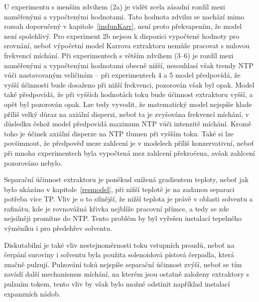 U experimentu s menším zdvihem (2a) je vidět zcela zásadní rozdíl mezi naměřenými a vypočtenými hodnotami.
Tato hodnota zdvihu se nachází mimo rozsah doporučený v kapitole~\ref{insfunKarr}, není proto překvapením, že model není spolehlivý.
Pro experiment 2b nejsou k dispozici vypočtené hodnoty pro srovnání, neboť výpočetní model Karrova extraktoru nemůže pracovat s nulovou frekvencí míchání.
Při experimentech s větším zdvihem (3--6) je rozdíl mezi naměřenými a vypočtenými hodnotami obecně nižší, nesouhlasí však trendy NTP vůči nastavovaným veličinám -- při experimentech 4 a 5 model předpovídá, že vyšší účinnosti bude dosaženo při nižší frekvenci, pozorován však byl opak.
Model také předpovídá, že při vyšších hodnotách toku bude účinnost extraktoru vyšší, a opět byl pozorován opak.
Lze tedy vyvodit, že matematický model nejspíše klade příliš velký důraz na axiální disperzi, neboť ta je zvyšována frekvencí míchání, v důsledku čehož model předpovídá maximum NTP vůči intenzitě míchání.
Kromě toho je účinek axiální disperze na NTP tlumen při vyšším toku.
Také si lze povšimnout, že předpověď meze zahlcení je v modelech příliš konzervativní, neboť při mnoha experimentech byla vypočtená mez zahlcení překročena, avšak zahlcení pozorováno nebylo.

Separační účinnost extraktoru je poněkud snížená gradientem teploty, neboť jak bylo ukázáno v kapitole~\ref{resmodel}, při nižší teplotě je na zadanou separaci potřeba více TP.
Vliv je o to silnější, že nižší teplota je právě v oblasti solventu a rafinátu, kde je rovnovážná křivka nejblíže pracovní přímce, a tedy se zde nejsilněji promítne do NTP.
Tento problém by byl vyřešen instalací tepelného výměníku i pro předehřev solventu.

Diskutabilní je také vliv nestejnoměrnosti toku vstupních proudů, neboť na čerpání suroviny i solventu byla použita solenoidová pístová čerpadla, která značně pulzují.
Pulzování toků nejspíše separační účinnost zvýší, neboť se tím zavádí další mechanismus míchání, na kterém jsou ostatně založeny extraktory s pulzním tokem, tento vliv by však bylo možné odstínit například instalací expanzních nádob.
